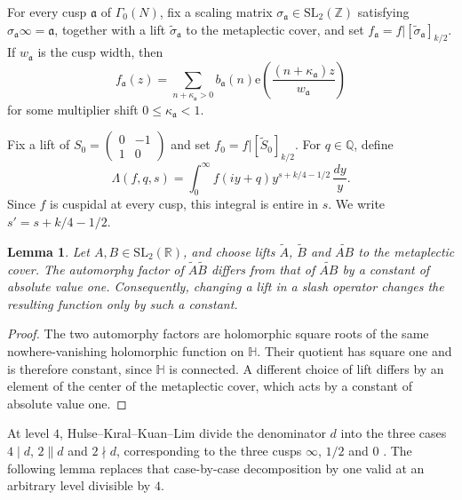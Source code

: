 \documentclass[10pt,a4paper]{amsart}
\newtheorem{lemma}[theorem]{Lemma}
\newcommand{\e}{\mathrm{e}}
\newcommand{\R}{\mathbb R}
\newcommand{\Q}{\mathbb Q}
\newcommand{\Z}{\mathbb Z}
\newcommand{\Hh}{\mathbb H}
\newcommand{\wt}{\widetilde}
\begin{document}
For every cusp $\mathfrak a$ of $\Gamma_0(N)$, fix a scaling matrix
$\sigma_{\mathfrak a}\in\mathrm{SL}_2(\Z)$ satisfying
$\sigma_{\mathfrak a}\infty=\mathfrak a$, together with a lift
$\wt\sigma_{\mathfrak a}$ to the metaplectic cover, and set
$f_{\mathfrak a}=f|[\wt\sigma_{\mathfrak a}]_{k/2}$. If
$w_{\mathfrak a}$ is the cusp width, then
\[
f_{\mathfrak a}(z)=\sum_{n+\kappa_{\mathfrak a}>0}b_{\mathfrak a}(n)
\e\left(\frac{(n+\kappa_{\mathfrak a})z}{w_{\mathfrak a}}\right)
\]
for some multiplier shift $0\leq\kappa_{\mathfrak a}<1$.

Fix a lift of $S_0=\begin{pmatrix}0&-1\\1&0\end{pmatrix}$ and set
$f_0=f|[\wt S_0]_{k/2}$. For $q\in\Q$, define
\[
\Lambda(f,q,s)=\int_0^\infty f(iy+q)y^{s+k/4-1/2}\,\frac{dy}{y}.
\]
Since $f$ is cuspidal at every cusp, this integral is entire in $s$. We
write $s'=s+k/4-1/2$.

\begin{lemma}\label{lem:metaplectic-constant}
Let $A,B\in\mathrm{SL}_2(\R)$, and choose lifts $\widetilde A$,
$\widetilde B$ and $\widetilde{AB}$ to the metaplectic cover. The
automorphy factor of $\widetilde A\widetilde B$ differs from that of
$\widetilde{AB}$ by a constant of absolute value one. Consequently,
changing a lift in a slash operator changes the resulting function only
by such a constant.
\end{lemma}

\begin{proof}
The two automorphy factors are holomorphic square roots of the same
nowhere-vanishing holomorphic function on $\Hh$. Their quotient has square
one and is therefore constant, since $\Hh$ is connected. A different
choice of lift differs by an element of the center of the metaplectic
cover, which acts by a constant of absolute value one.
\end{proof}

At level $4$, Hulse--K\i ral--Kuan--Lim divide the denominator $d$ into the three cases $4\mid d$, $2\parallel d$ and $2\nmid d$, corresponding to the three cusps $\infty$, $1/2$ and $0$ \cite[Lemma 4.3]{HKKL}. The following lemma replaces that case-by-case decomposition by one valid at an arbitrary level divisible by $4$.
\end{document}
